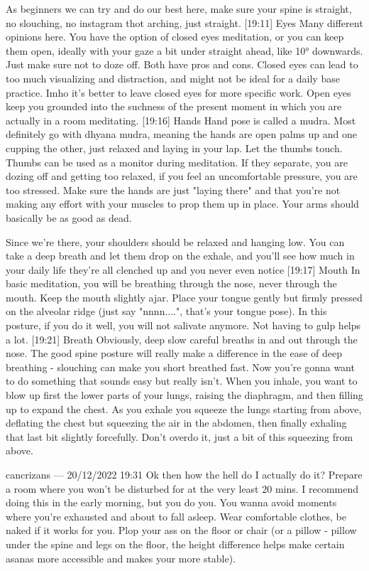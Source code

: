 \documentclass[a4paper,14pt]{memoir}
\begin{document}
As beginners we can try and do our best here, make sure your spine is straight, no slouching, no instagram thot arching, just straight.
[19:11]
Eyes
Many different opinions here. You have the option of closed eyes meditation, or you can keep them open, ideally with your gaze a bit under straight ahead, like 10° downwards. Just make sure not to doze off. Both have pros and cons. Closed eyes can lead to too much visualizing and distraction, and might not be ideal for a daily base practice. Imho it's better to leave closed eyes for more specific work. Open eyes keep you grounded into the suchness of the present moment in which you are actually in a room meditating.
[19:16]
Hands
Hand pose is called a mudra. Most definitely go with dhyana mudra, meaning the hands are open palms up and one cupping the other, just relaxed and laying in your lap. Let the thumbs touch. Thumbs can be used as a monitor during meditation. If they separate, you are dozing off and getting too relaxed, if you feel an uncomfortable pressure, you are too stressed. Make sure the hands are just "laying there" and that you're not making any effort with your muscles to prop them up in place. Your arms should basically be as good as dead.

Since we're there, your shoulders should be relaxed and hanging low. You can take a deep breath and let them drop on the exhale, and you'll see how much in your daily life they're all clenched up and you never even notice
[19:17]
Mouth
In basic meditation, you will be breathing through the nose, never through the mouth. Keep the mouth slightly ajar. Place your tongue gently but firmly pressed on the alveolar ridge (just say "nnnn....", that's your tongue pose). In this posture, if you do it well, you will not salivate anymore. Not having to gulp helps a lot.
[19:21]
Breath
Obviously, deep slow careful breaths in and out through the nose. The good spine posture will really make a difference in the ease of deep breathing - slouching can make you short breathed fast. Now you're gonna want to do something that sounds easy but really isn't. When you inhale, you want to blow up first the lower parts of your lungs, raising the diaphragm, and then filling up to expand the  chest. As you exhale you squeeze the lungs starting from above, deflating the chest but squeezing the air in the abdomen, then finally exhaling that last bit slightly forcefully. Don't overdo it, just a bit of this squeezing from above.

cancrizans — 20/12/2022 19:31
Ok then how the hell do I actually do it?
Prepare a room where you won't be disturbed for at the very least 20 mins. I recommend doing this in the early morning, but you do you. You wanna avoid moments where you're exhausted and about to fall asleep. Wear comfortable clothes, be naked if it works for you. Plop your ass on the floor or chair (or a pillow - pillow under the spine and legs on the floor, the height difference helps make certain asanas more accessible and makes your more stable). 
\end{document}
